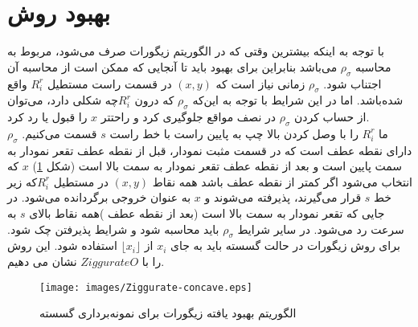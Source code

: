    \section{بهبود روش }   
با توجه به اینکه بیشترین وقتی که در الگوریتم زیگورات صرف می‌شود، مربوط به محاسبه $\rho _{\sigma}$ می‌باشد بنابراین برای بهبود باید تا آنجایی که ممکن است از محاسبه آن اجتناب شود. $\rho _{\sigma}$ زمانی نیاز است که $(x,y)$ در قسمت راست مستطیل $R^{r} _{i}$ واقع شده‌باشد. اما در این شرایط با توجه به این‌که $\rho _{\sigma}$  که درون $R^{r} _{i}$چه شکلی دارد، می‌توان از حساب کردن $\rho _{\sigma}$ در نصف مواقع جلوگیری کرد و راحتتر $x$ را قبول یا رد کرد.
\\
ما $R^{r} _{i}$ را با وصل کردن بالا چپ به پایین راست با خط راست $s$ قسمت می‌کنیم. $\rho _{\sigma}$   دارای نقطه عطف است که در قسمت مثبت نمودار، قبل از نقطه عطف تقعر نمودار به سمت پایین است و بعد از نقطه عطف تقعر نمودار به سمت بالا است (شکل  \ref{ZiggurateO})   $x$ که انتخاب می‌شود اگر کمتر از نقطه عطف باشد همه نقاط $(x,y)$ در مستطیل $R^{r} _{i}$که زیر خط $s$ قرار می‌گیرند، پذیرفته می‌شوند و $x$ به عنوان خروجی برگردانده می‌شود. در جایی که تقعر نمودار به سمت بالا است (بعد از نقطه عطف )همه نقاط بالای $s$ به سرعت رد می‌شود. در سایر شرایط $\rho _{\sigma}$ باید محاسبه شود و شرایط پذیرفتن چک شود. برای روش زیگورات در حالت گسسته باید به جای $x_{i}$ از $\lfloor x_{i}\rfloor $ استفاده شود. این روش را با $ZiggurateO$  نشان می دهیم\cite{510}.
    \begin{figure}[!htb]
      	\centering
      	\texttt{[image: images/Ziggurate-concave.eps]}
      	\caption{الگوریتم  بهبود یافته زیگورات برای نمونه‌برداری گسسته}

		\label{ZiggurateO}
      \end{figure}
      

